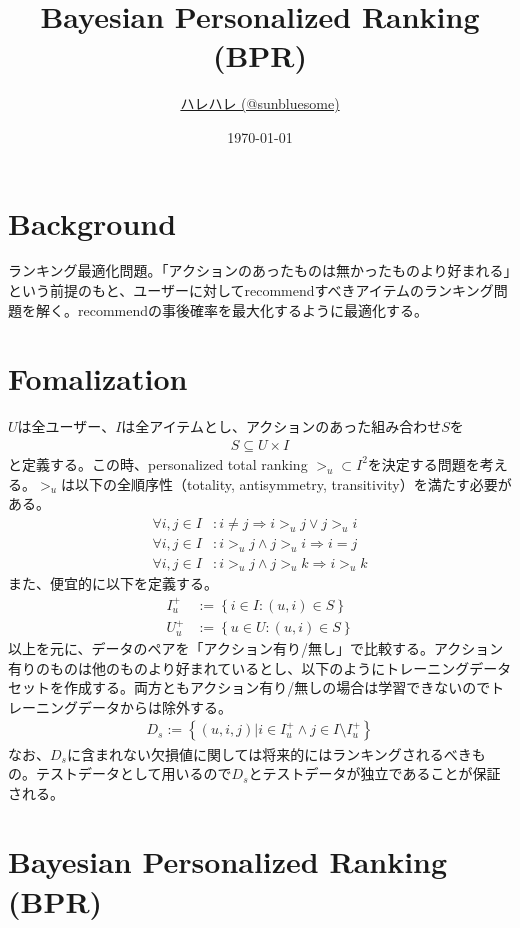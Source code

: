 \documentclass[onecolumn,10pt]{article}
\title{Bayesian Personalized Ranking (BPR) }
\author{\href{https://twitter.com/sunbluesome}{ハレハレ (@sunbluesome)}}
\date{\today}
\begin{document}
 
\maketitle 
\tableofcontents
\newpage

\section{Background}
ランキング最適化問題。「アクションのあったものは無かったものより好まれる」という前提のもと、ユーザーに対してrecommendすべきアイテムのランキング問題を解く。recommendの事後確率を最大化するように最適化する。

\section{Fomalization}
$U$は全ユーザー、$I$は全アイテムとし、アクションのあった組み合わせ$S$を
\begin{align}
	S \subseteq U \times I
\end{align}
と定義する。この時、personalized total ranking $>_u \subset I^2$を決定する問題を考える。$>_u$は以下の全順序性（totality, antisymmetry, transitivity）を満たす必要がある。
\begin{align}
	\forall i, j \in I &: i \neq j \Rightarrow i >_u j \lor j >_u i \\
	\forall i, j \in I &: i >_u j \land j >_u i \Rightarrow i = j \\
	\forall i, j \in I &: i >_u j \land j >_u k \Rightarrow i >_u k
\end{align}
また、便宜的に以下を定義する。
\begin{align}
	I_{u}^{+}  &:= \left\{i \in I : (u, i) \in S \right\} \\
	U_{u}^{+}  &:= \left\{u \in U : (u, i) \in S \right\}
\end{align}
以上を元に、データのペアを「アクション有り/無し」で比較する。アクション有りのものは他のものより好まれているとし、以下のようにトレーニングデータセットを作成する。両方ともアクション有り/無しの場合は学習できないのでトレーニングデータからは除外する。
\begin{align}
	D_s := \left\{(u, i, j) | i \in I_{u}^{+} \land j \in I \setminus  I_{u}^{+} \right\}
\end{align}
なお、$D_s$に含まれない欠損値に関しては将来的にはランキングされるべきもの。テストデータとして用いるので$D_s$とテストデータが独立であることが保証される。

\section{Bayesian Personalized Ranking (BPR)}
\end{document}
